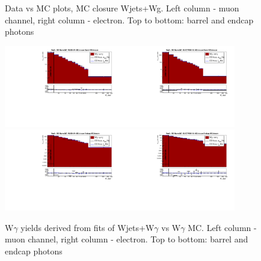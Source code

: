\begin{figure}[htb]
\begin{center}
  \caption{Data vs MC plots, MC closure Wjets+Wg. Left column - muon channel, right column - electron. Top to bottom: barrel and endcap photons}
  \label{fig:DATAvsMC_MCclosureWjetsPlusWg}
  \end{center}
\end{figure}

 \begin{figure}[htb]
  \begin{center}
   \includegraphics[width=0.45\textwidth]{../figs/figs_v11/MUON_WGamma/MCclosureWjetsPlusWg/c_TrueDDvsMC_c_MUON_WGamma__UNblind_MCclosure__Barrel__phoEt_MCclosure.pdf}\includegraphics[width=0.45\textwidth]{../figs/figs_v11/ELECTRON_WGamma/MCclosureWjetsPlusWg/c_TrueDDvsMC_c_ELECTRON_WGamma__UNblind_MCclosure__Barrel__phoEt_MCclosure.pdf}
   \includegraphics[width=0.45\textwidth]{../figs/figs_v11/MUON_WGamma/MCclosureWjetsPlusWg/c_TrueDDvsMC_c_MUON_WGamma__UNblind_MCclosure__Endcap__phoEt_MCclosure.pdf}\includegraphics[width=0.45\textwidth]{../figs/figs_v11/ELECTRON_WGamma/MCclosureWjetsPlusWg/c_TrueDDvsMC_c_ELECTRON_WGamma__UNblind_MCclosure__Endcap__phoEt_MCclosure.pdf}
  \caption{W$\gamma$ yields derived from fits of Wjets+W$\gamma$ vs W$\gamma$ MC. Left column - muon channel, right column - electron. Top to bottom: barrel and endcap photons}
  \label{fig:TrueDDvsMC_MCclosureWjetsPlusWg}
  \end{center}
\end{figure}

